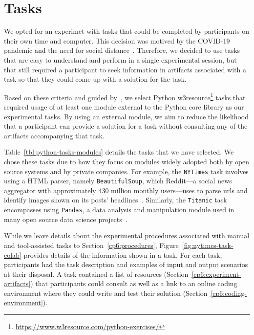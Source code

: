
\section{Tasks}
\label{cp6:tasks}



We opted for an experimet with tasks that could be completed by participants on their own time and computer.
This decision was motived by the COVID-19 pandemic and the need for social distance~\cite{}. 
Therefore, we decided to use tasks that are easy to understand and perform in a single experimental session, but that still required a participant  
to seek information in artifacts associated with a task
so that they could come up with a solution for the task.




Based on these criteria and guided by~\cite{thiselton2019}, we select Python w3resource\footnote{\url{https://www.w3resource.com/python-exercises/}} tasks
that required usage of at least one module external to the Python core library as our experimental tasks.
By using an external module, we aim to reduce the likelihood that a participant 
can provide a solution for a task without consulting any of the artifacts accompanying that task. 






Table~\ref{tbl:python-tasks-modules} details the tasks that we have selected. 
We chose these tasks due to how they focus on modules widely adopted both by open source systems and by private companies.
For example, the \texttt{NYTimes} task involves using a HTML parser, namely \texttt{BeautifulSoup},
which Reddit---a social news aggregator with approximately 430 million monthly users---uses 
to parse urls and identify images shown on its posts' headlines~\cite{bs4-reddit}. 
Similarly, the \texttt{Titanic} task encompasses using \texttt{Pandas}, a data analysis and manipulation module
used in many open source data science projects~\cite{ma2017, shrestha2020}.



While we leave details about the experimental procedures associated with manual and tool-assisted tasks to Section~\ref{cp6:procedures}, Figure~\ref{fig:nytimes-task-colab} provides details of the information shown in a task.
For each task, participants had the task description and examples of input and output scenarios at their disposal. A task contained a list of resources (Section~\ref{cp6:experiment-artifacts}) that participants could consult
as well as a link to an online coding environment
where they could write and test their solution (Section~\ref{cp6:coding-environment}). 

